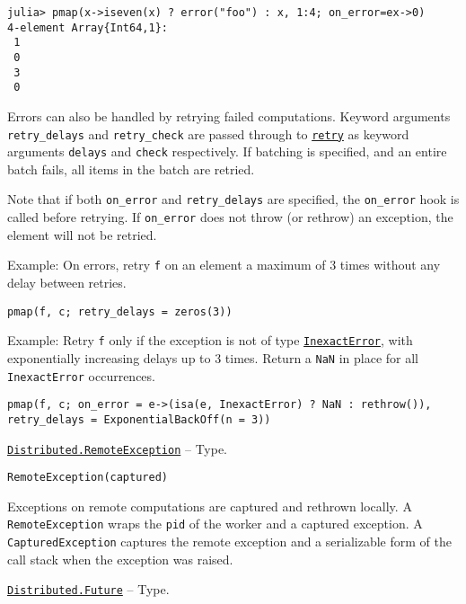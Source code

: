 \begin{adjustwidth}{2em}{0pt}
\begin{verbatim}
julia> pmap(x->iseven(x) ? error("foo") : x, 1:4; on_error=ex->0)
4-element Array{Int64,1}:
 1
 0
 3
 0
\end{verbatim}

Errors can also be handled by retrying failed computations. Keyword arguments \texttt{retry\_delays} and \texttt{retry\_check} are passed through to \hyperlink{13615447016541985376}{\texttt{retry}} as keyword arguments \texttt{delays} and \texttt{check} respectively. If batching is specified, and an entire batch fails, all items in the batch are retried.

Note that if both \texttt{on\_error} and \texttt{retry\_delays} are specified, the \texttt{on\_error} hook is called before retrying. If \texttt{on\_error} does not throw (or rethrow) an exception, the element will not be retried.

Example: On errors, retry \texttt{f} on an element a maximum of 3 times without any delay between retries.


\begin{verbatim}
pmap(f, c; retry_delays = zeros(3))
\end{verbatim}

Example: Retry \texttt{f} only if the exception is not of type \hyperlink{5399118524830636312}{\texttt{InexactError}}, with exponentially increasing delays up to 3 times. Return a \texttt{NaN} in place for all \texttt{InexactError} occurrences.


\begin{verbatim}
pmap(f, c; on_error = e->(isa(e, InexactError) ? NaN : rethrow()), retry_delays = ExponentialBackOff(n = 3))
\end{verbatim}



\end{adjustwidth}
\hypertarget{10250718604436154991}{} 
\hyperlink{10250718604436154991}{\texttt{Distributed.RemoteException}}  -- {Type.}

\begin{adjustwidth}{2em}{0pt}


\begin{verbatim}
RemoteException(captured)
\end{verbatim}

Exceptions on remote computations are captured and rethrown locally.  A \texttt{RemoteException} wraps the \texttt{pid} of the worker and a captured exception. A \texttt{CapturedException} captures the remote exception and a serializable form of the call stack when the exception was raised.



\end{adjustwidth}
\hypertarget{4170271048165085864}{} 
\hyperlink{4170271048165085864}{\texttt{Distributed.Future}}  -- {Type.}

